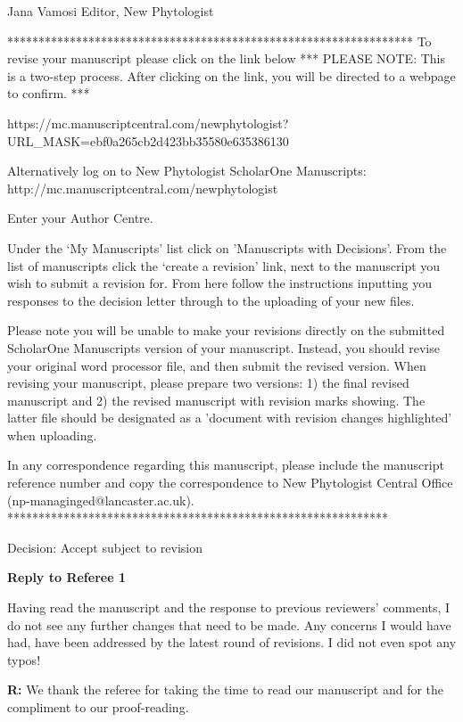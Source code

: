 \documentclass[12pt]{letter}
\newenvironment{refquote}{\bigskip \begin{it}}{\end{it}\smallskip}
\begin{document}
Jana Vamosi
Editor, New Phytologist

*****************************************************************
To revise your manuscript please click on the link below
*** PLEASE NOTE: This is a two-step process. After clicking on the link, you will be directed to a webpage to confirm. ***

https://mc.manuscriptcentral.com/newphytologist?URL_MASK=ebf0a265cb2d423bb35580e635386130

Alternatively log on to New Phytologist ScholarOne Manuscripts:
http://mc.manuscriptcentral.com/newphytologist

Enter your Author Centre.

Under the ‘My Manuscripts' list click on 'Manuscripts with Decisions'. From the list of manuscripts click the ‘create a revision' link, next to the manuscript you wish to submit a revision for. From here follow the instructions inputting you responses to the decision letter through to the uploading of your new files.

Please note you will be unable to make your revisions directly on the submitted ScholarOne Manuscripts version of your manuscript. Instead, you should revise your original word processor file, and then submit the revised version. When revising your manuscript, please prepare two versions: 1) the final revised manuscript and 2) the revised manuscript with revision marks showing. The latter file should be designated as a 'document with revision changes highlighted' when uploading.

In any correspondence regarding this manuscript, please include the manuscript reference number and copy the correspondence to New Phytologist Central Office (np-managinged@lancaster.ac.uk).
*************************************************************


Decision: Accept subject to revision

\clearpage

{\Large \bf Reply to Referee 1}

\begin{refquote}
Having read the manuscript and the response to previous reviewers’ comments, I do not see any further changes that need to be made. Any concerns I would have had, have been addressed by the latest round of revisions. I did not even spot any typos!
\end{refquote}

\textbf{R:} We thank the referee for taking the time to read our manuscript and for the compliment to our proof-reading.
\end{document}

